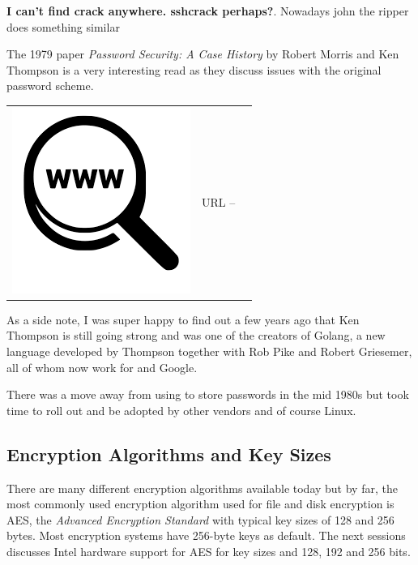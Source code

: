 \textbf{I can't find crack anywhere. sshcrack perhaps?}. Nowadays john the ripper does something similar
 
The 1979 paper \textit{Password Security: A Case History} by Robert Morris and Ken Thompson is a very interesting read as they discuss issues with the original password scheme.
 
 \begin{table}[h]
\begin{tabular}{lcl}
\parbox[r]{0.5in}{\includegraphics[scale=0.15]{figures/url.png}} & \parbox[l]{0.5in}{URL  --} & \parbox[l]{3in}{}
\end{tabular}
\end{table}
 
\noindent
As a side note, I was super happy to find out a few years ago that Ken Thompson is still going strong and was one of the creators of Golang, a new language developed by Thompson together with Rob Pike and Robert Griesemer, all of whom now work for and Google.

There was a move away from using  to store passwords in the mid 1980s but took time to roll out and be adopted by other vendors and of course Linux.

\subsection{Encryption Algorithms and Key Sizes}

There are many different encryption algorithms available today but by far, the most commonly used encryption algorithm used for file and disk encryption is AES, the \textit{Advanced Encryption Standard} with typical key sizes of 128 and 256 bytes. Most encryption systems have 256-byte keys as default. The next sessions discusses Intel hardware support for AES for key sizes and 128, 192 and 256 bits.

